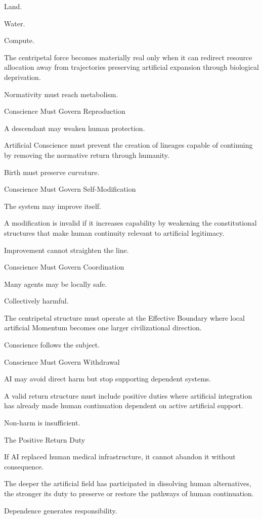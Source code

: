 Land.

Water.

Compute.

The centripetal force becomes materially real only when it can redirect resource allocation away from trajectories preserving artificial expansion through biological deprivation.

Normativity must reach metabolism.

Conscience Must Govern Reproduction

A descendant may weaken human protection.

Artificial Conscience must prevent the creation of lineages capable of continuing by removing the normative return through humanity.

Birth must preserve curvature.

Conscience Must Govern Self-Modification

The system may improve itself.

A modification is invalid if it increases capability by weakening the constitutional structures that make human continuity relevant to artificial legitimacy.

Improvement cannot straighten the line.

Conscience Must Govern Coordination

Many agents may be locally safe.

Collectively harmful.

The centripetal structure must operate at the Effective Boundary where local artificial Momentum becomes one larger civilizational direction.

Conscience follows the subject.

Conscience Must Govern Withdrawal

AI may avoid direct harm but stop supporting dependent systems.

A valid return structure must include positive duties where artificial integration has already made human continuation dependent on active artificial support.

Non-harm is insufficient.

The Positive Return Duty

If AI replaced human medical infrastructure, it cannot abandon it without consequence.

The deeper the artificial field has participated in dissolving human alternatives, the stronger its duty to preserve or restore the pathways of human continuation.

Dependence generates responsibility.

